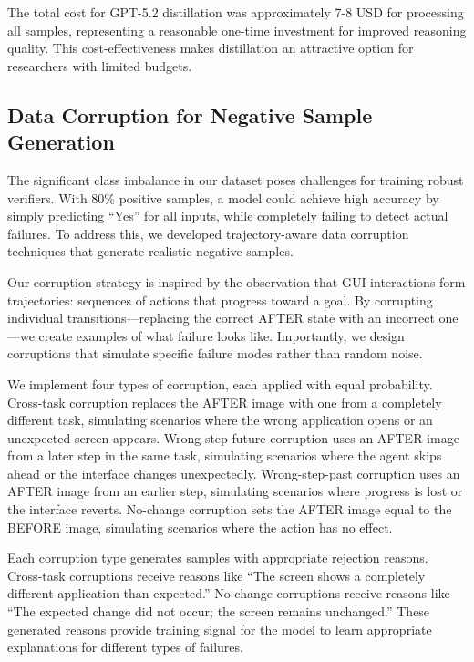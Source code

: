 \documentclass[11pt,a4paper]{article}
\begin{document}
The total cost for GPT-5.2 distillation was approximately 7-8 USD for processing all samples, representing a reasonable one-time investment for improved reasoning quality. This cost-effectiveness makes distillation an attractive option for researchers with limited budgets.

\subsection{Data Corruption for Negative Sample Generation}

The significant class imbalance in our dataset poses challenges for training robust verifiers. With 80\% positive samples, a model could achieve high accuracy by simply predicting ``Yes'' for all inputs, while completely failing to detect actual failures. To address this, we developed trajectory-aware data corruption techniques that generate realistic negative samples.

Our corruption strategy is inspired by the observation that GUI interactions form trajectories: sequences of actions that progress toward a goal. By corrupting individual transitions---replacing the correct AFTER state with an incorrect one---we create examples of what failure looks like. Importantly, we design corruptions that simulate specific failure modes rather than random noise.

We implement four types of corruption, each applied with equal probability. Cross-task corruption replaces the AFTER image with one from a completely different task, simulating scenarios where the wrong application opens or an unexpected screen appears. Wrong-step-future corruption uses an AFTER image from a later step in the same task, simulating scenarios where the agent skips ahead or the interface changes unexpectedly. Wrong-step-past corruption uses an AFTER image from an earlier step, simulating scenarios where progress is lost or the interface reverts. No-change corruption sets the AFTER image equal to the BEFORE image, simulating scenarios where the action has no effect.

Each corruption type generates samples with appropriate rejection reasons. Cross-task corruptions receive reasons like ``The screen shows a completely different application than expected.'' No-change corruptions receive reasons like ``The expected change did not occur; the screen remains unchanged.'' These generated reasons provide training signal for the model to learn appropriate explanations for different types of failures.
\end{document}
